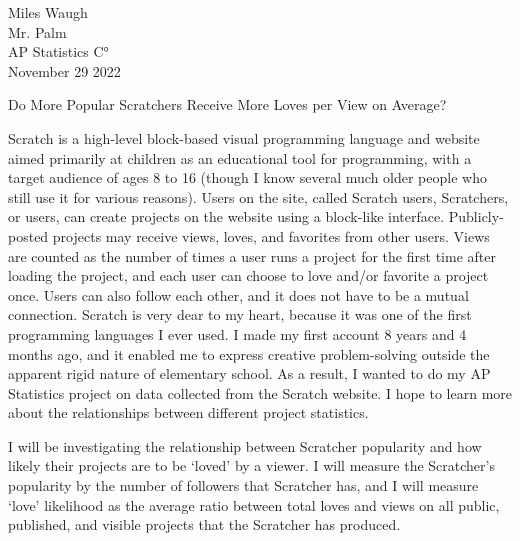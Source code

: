 \documentclass[12pt]{article}
\begin{document}
\begin{flushleft}
	
	Miles Waugh\\
	Mr. Palm\\
	AP Statistics C°\\
	November 29 2022\\
	
	
	\begin{center}
		Do More Popular Scratchers Receive More Loves per View on Average?
	\end{center}
	
	
	\setlength{\parindent}{0.5in}
	

	Scratch is a high-level block-based visual programming language and website aimed primarily at children as an educational tool for programming, with a target audience of ages 8 to 16 (though I know several much older people who still use it for various reasons). Users on the site, called Scratch users, Scratchers, or users, can create projects on the website using a block-like interface. Publicly-posted projects may receive views, loves, and favorites from other users. Views are counted as the number of times a user runs a project for the first time after loading the project, and each user can choose to love and/or favorite a project once. Users can also follow each other, and it does not have to be a mutual connection.
	Scratch is very dear to my heart, because it was one of the first programming languages I ever used. I made my first account 8 years and 4 months ago, and it enabled me to express creative problem-solving outside the apparent rigid nature of elementary school. As a result, I wanted to do my AP Statistics project on data collected from the Scratch website. I hope to learn more about the relationships between different project statistics.
	
	I will be investigating the relationship between Scratcher popularity and how likely their projects are to be ‘loved’ by a viewer. I will measure the Scratcher’s popularity by the number of followers that Scratcher has, and I will measure ‘love’ likelihood as the average ratio between total loves and views on all public, published, and visible projects that the Scratcher has produced.
	

\end{flushleft}
\end{document}
